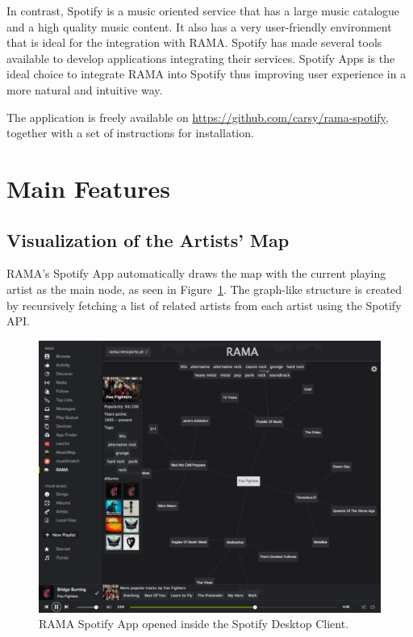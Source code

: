 \documentclass{article}
\begin{document}
    In contrast, Spotify is a music oriented service that has a large music catalogue and a high quality music content.
    It also has a very user-friendly environment that is ideal for the integration with RAMA.
    Spotify has made several tools available to develop applications\cite{spotifydev} integrating their services.
    Spotify Apps is the ideal choice to integrate RAMA into Spotify thus improving user experience in a more natural and intuitive way.

    The application is freely available on \url{https://github.com/carsy/rama-spotify}, together with a 
    set of instructions for installation.

  \vspace{-0.2cm}
  \section{Main Features}
  \label{sec:features}

    \subsection{Visualization of the Artists' Map}
    \label{sub:visualization}

      RAMA's Spotify App automatically draws the map with the current playing artist as the main node, as seen in Figure~\ref{fig:spotify_app}.
      The graph-like structure is created by recursively fetching a list of related artists from each artist using the Spotify API\cite{spotifyapiartists}.
      \begin{figure}[hb]
        \begin{center}
          \includegraphics[width=\columnwidth]{../report/figures/graph_rootnode.pdf}
        \end{center}
        \caption{RAMA Spotify App opened inside the Spotify Desktop Client.}
        \label{fig:spotify_app}
      \end{figure}
\end{document}
